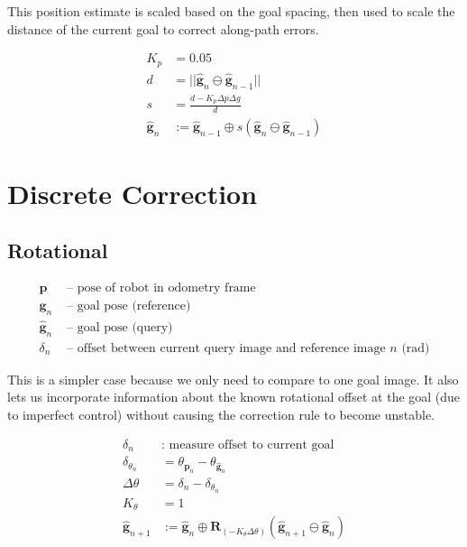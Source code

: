\documentclass{article}
\begin{document}
This position estimate is scaled based on the goal spacing, then used to scale the distance of the current goal to correct along-path errors.

\begin{align*}
	K_p &= 0.05 \\
	d &= ||\boldsymbol{\hat g}_n \ominus \boldsymbol{\hat g}_{n-1}||\\
	s &= \frac{d - K_p\Delta p \Delta g} {d} \\
	\boldsymbol{\hat g}_n &:= \boldsymbol{\hat g}_{n-1} \oplus s(\boldsymbol{\hat g}_n \ominus \boldsymbol{\hat g}_{n-1})
\end{align*}

\section{Discrete Correction}

\subsection{Rotational}

\begin{align*}
	\boldsymbol{p} & \text{ -- pose of robot in odometry frame} \\
	\boldsymbol{g}_n & \text{ -- goal pose (reference)} \\
	\boldsymbol{\hat g}_n & \text{ -- goal pose (query)} \\
	\delta_n & \text{ -- offset between current query image and reference image } n \text{ (rad)}
\end{align*}

This is a simpler case because we only need to compare to one goal image. It also lets us incorporate information about the known rotational offset at the goal (due to imperfect control) without causing the correction rule to become unstable.

\begin{align*}
	\delta_n &: \text{ measure offset to current goal} \\
	\delta_{\theta_n} &= \theta_{\boldsymbol{p}_n} - \theta_{\boldsymbol{\hat g}_n}\\
	\Delta\theta &= \delta_n - \delta_{\theta_n} \\
	K_\theta &= 1 \\
	\boldsymbol{\hat g}_{n+1} &:= \boldsymbol{\hat g}_{n} \oplus \boldsymbol{R}_{(-K_\theta\Delta\theta)}(\boldsymbol{\hat g}_{n+1} \ominus \boldsymbol{\hat g}_{n})
\end{align*}
\end{document}
